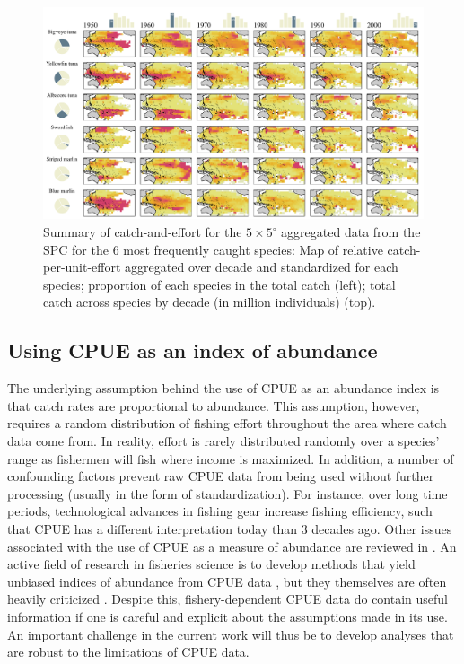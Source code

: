 \documentclass{article}
\newcommand{\griddef}[2]{$#1 \times #2^\circ$}
\begin{document}
\begin{landscape}
\begin{figure}
\includegraphics[scale=0.725]{PhD_Proposal_Spring2013_Fig1_nogrid}
\caption{\label{fig1}
Summary of catch-and-effort for the \griddef{5}{5} aggregated data from
  the SPC for the 6 most frequently caught species: Map of relative
  catch-per-unit-effort aggregated over decade and standardized for
  each species; proportion of
  each species in the total catch (left); total catch across species
  by decade  (in million individuals) (top).}
\end{figure}
\end{landscape}

\subsection{Using CPUE as an index of abundance}

The underlying assumption behind the use of CPUE as
an abundance index is that catch rates are proportional to
abundance. This assumption, however, requires a random distribution of fishing
effort throughout the area where catch data come from. In reality, effort is rarely distributed randomly
over a species' range as fishermen will fish where income is
maximized. In addition, a number of confounding factors prevent raw
CPUE data from being used without further processing (usually in the form of
standardization). For instance, over long time periods, technological
advances in fishing gear increase fishing efficiency, such that CPUE
has a different interpretation today than 3 decades ago. Other issues
associated with the use of CPUE as a measure of abundance are reviewed
in \citet{Harley2001_a}. An active field of research in fisheries
science is to develop methods that yield unbiased indices of
abundance from CPUE data \citep[e.g.][]{Campbell2004_a}, but they
themselves are often heavily criticized
\citep{Carruthers2010_a}. Despite this, fishery-dependent CPUE data do
contain useful information if one is careful and explicit
about the assumptions made in its use. An important challenge in
the current work will thus be to develop analyses that are robust to
the limitations of CPUE data.
\end{document}

